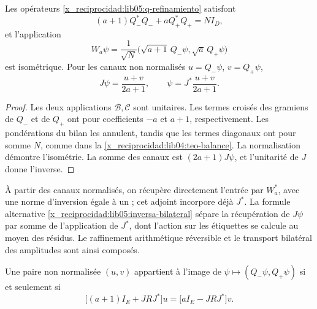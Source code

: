 \begin{proposition}
\label{x_reciprocidad:lib05:prop-bilateral}
Les opérateurs \eqref{x_reciprocidad:lib05:q-refinamiento} satisfont
\begin{equation}
 (a+1)Q_-^*Q_-+aQ_+^*Q_+=NI_D,
 \label{x_reciprocidad:lib05:balance}
\end{equation}
et l’application
\begin{equation}
 W_a\psi=\frac1{\sqrt N}
    \bigl(\sqrt{a+1}\,Q_-\psi,\sqrt a\,Q_+\psi\bigr)
 \label{x_reciprocidad:lib05:w}
\end{equation}
est isométrique. Pour les canaux non normalisés \(u=Q_-\psi\), \(v=Q_+\psi\),
\begin{equation}
 J\psi=\frac{u+v}{2a+1},\qquad
 \psi=J^*\frac{u+v}{2a+1}.
 \label{x_reciprocidad:lib05:inversa-bilateral}
\end{equation}
\end{proposition}

\begin{proof}
Les deux applications \(\mathcal B,\mathcal C\) sont unitaires.
Les termes croisés des gramiens de \(Q_-\) et de \(Q_+\) ont pour
coefficients \(-a\) et \(a+1\), respectivement. Les pondérations
du bilan les annulent, tandis que les termes diagonaux ont pour somme
\(N\), comme dans la \cref{x_reciprocidad:lib04:teo-balance}. La normalisation
démontre l’isométrie. La somme des canaux est
\((2a+1)J\psi\), et l’unitarité de \(J\) donne l’inverse.
\end{proof}

À partir des canaux normalisés, on récupère directement l'entrée par \(W_a^*\), avec une norme d'inversion égale à un ; cet adjoint incorpore déjà \(J^*\). La formule alternative \eqref{x_reciprocidad:lib05:inversa-bilateral} sépare la récupération de \(J\psi\) par somme de l'application de \(J^*\), dont l'action sur les étiquettes se calcule au moyen des résidus. Le raffinement arithmétique réversible et le transport bilatéral des amplitudes sont ainsi composés.

\begin{proposition}
\label{x_reciprocidad:lib05:prop-compatibilidad}
Une paire non normalisée \((u,v)\) appartient à l’image de
\(\psi\mapsto(Q_-\psi,Q_+\psi)\) si et seulement si
\begin{equation}
 \bigl[(a+1)I_E+JRJ^*\bigr]u
 =\bigl[aI_E-JRJ^*\bigr]v.
 \label{x_reciprocidad:lib05:compatibilidad}
\end{equation}
\end{proposition}

